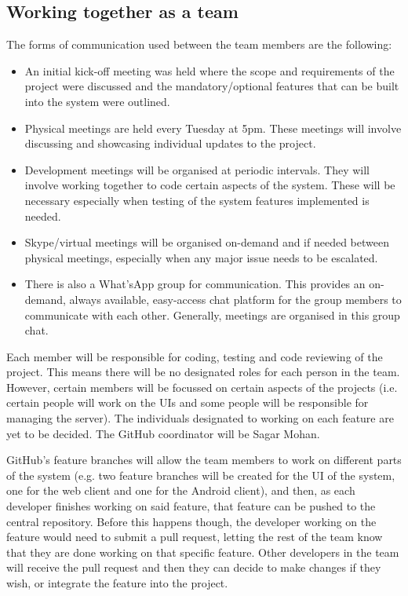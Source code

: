 \documentclass[11pt,a4paper]{article}
\begin{document}
\subsection{Working together as a team}
The forms of communication used between the team members are the following:
\begin{itemize}
\item An initial kick-off meeting was held where the scope and requirements of the project were discussed and the mandatory/optional features that can be built into the system were outlined.
\item Physical meetings are held every Tuesday at 5pm. These meetings will involve discussing and showcasing individual updates to the project. 
\item Development meetings will be organised at periodic intervals. They will involve working together to code certain aspects of the system. These will be necessary especially when testing of the system features implemented is needed.
\item Skype/virtual meetings will be organised on-demand and if needed between physical meetings, especially when any major issue needs to be escalated. 
\item There is also a What'sApp group for communication. This provides an on-demand, always available, easy-access chat platform for the group members to communicate with each other. Generally, meetings are organised in this group chat.
\end{itemize}
Each member will be responsible for coding, testing and code reviewing of the project. This means there will be no designated roles for each person in the team. However, certain members will be focussed on certain aspects of the projects (i.e. certain people will work on the UIs and some people will be responsible for managing the server). The individuals designated to working on each feature are yet to be decided. The GitHub coordinator will be Sagar Mohan.

GitHub’s feature branches will allow the team members to work on different parts of the system (e.g. two feature branches will be created for the UI of the system, one for the web client and one for the Android client), and then, as each developer finishes working on said feature, that feature can be pushed to the central repository. Before this happens though, the developer working on the feature would need to submit a pull request, letting the rest of the team know that they are done working on that specific feature. Other developers in the team will receive the pull request and then they can decide to make changes if they wish, or integrate the feature into the project.
\end{document}
